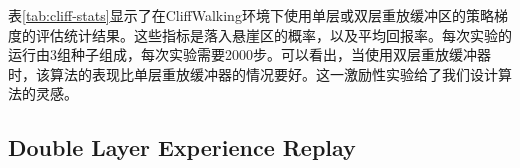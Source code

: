 表\ref{tab:cliff-stats}显示了在CliffWalking环境下使用单层或双层重放缓冲区的策略梯度的评估统计结果。这些指标是落入悬崖区的概率，以及平均回报率。每次实验的运行由3组种子组成，每次实验需要2000步。可以看出，当使用双层重放缓冲器时，该算法的表现比单层重放缓冲器的情况要好。这一激励性实验给了我们设计算法的灵感。

\subsection{Double Layer Experience Replay}




